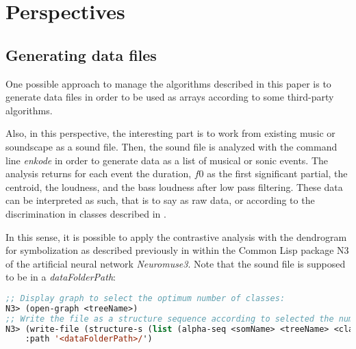 \newpage
\section{Perspectives}
\label{Perspective}

\subsection{Generating data files}
\label{gdf}

One possible approach to manage the algorithms described in this paper is to generate data files in order to be used as arrays according to some third-party algorithms. 

Also, in this perspective, the interesting part is to work from existing music or soundscape as a sound file. Then, the sound file is analyzed with the command line \textsl{enkode} in order to generate data as a list of musical or sonic events. The analysis returns for each event the duration, $f0$ as the first significant partial, the centroid, the loudness, and the bass loudness after low pass filtering. These data can be interpreted as such, that is to say as raw data, or according to the discrimination in classes described in . 

\smallskip

In this sense, it is possible to apply the contrastive analysis with the dendrogram for symbolization as described previously in  within the Common Lisp package N3 of the artificial neural network \textsl{Neuromuse3}.
Note that the sound file is supposed to be in a \textsl{dataFolderPath}:

\smallskip

 \begin{lstlisting}[basicstyle=\footnotesize\ttfamily,language=Lisp]
;; Display graph to select the optimum number of classes:
N3> (open-graph <treeName>)
;; Write the file as a structure sequence according to selected the number of classes:
N3> (write-file (structure-s (list (alpha-seq <somName> <treeName> <classesNumber>)) :result :last) :name '<fileName>.dat' 
    :path '<dataFolderPath>/')
\end{lstlisting}


